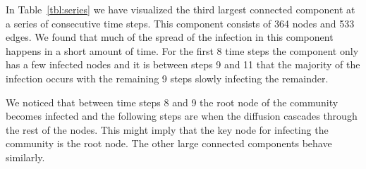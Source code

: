 \documentclass[12pt, oneside, openany]{article} %
\begin{document}
In Table~\ref{tbl:series} we have visualized the third largest connected component at a series of consecutive time steps. This component consists of 364 nodes and 533 edges. We found that much of the spread of the infection in this component happens in a short amount of time. For the first 8 time steps the component only has a few infected nodes and it is between steps 9 and 11 that the majority of the infection occurs with the remaining 9 steps slowly infecting the remainder.

We noticed that between time steps 8 and 9 the root node of the community becomes infected and the following steps are when the diffusion cascades through the rest of the nodes. This might imply that the key node for infecting the community is the root node. The other large connected components behave similarly.
\end{document}
